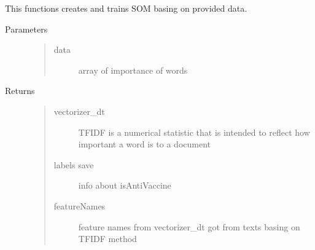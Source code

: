 \documentclass[letterpaper,10pt,english]{sphinxmanual}
\begin{document}
\begin{fulllineitems}
\label{\detokenize{som:som.som}}
\pysigstartsignatures
{}
\pysigstopsignatures
\sphinxAtStartPar
This functions creates and trains SOM basing on provided data.
\begin{description}
\item[{Parameters}] \leavevmode\begin{quote}\begin{description}
\item[{data}] \leavevmode
\sphinxAtStartPar
array of importance of words

\end{description}\end{quote}

\item[{Returns}] \leavevmode\begin{quote}\begin{description}
\item[{vectorizer\_dt}] \leavevmode
\sphinxAtStartPar
TF\sphinxhyphen{}IDF is a numerical statistic that is intended to reflect how important a word is to a document

\item[{labels save}] \leavevmode
\sphinxAtStartPar
info about isAntiVaccine

\item[{featureNames}] \leavevmode
\sphinxAtStartPar
feature names from vectorizer\_dt got from texts basing on TF\sphinxhyphen{}IDF method

\end{description}\end{quote}

\end{description}

\end{fulllineitems}

\end{document}
